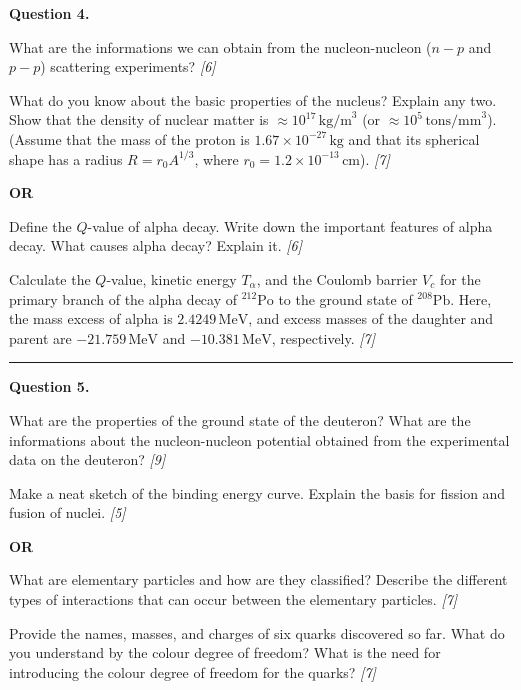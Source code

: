 \documentclass[11pt,a4paper]{article}
\newcommand{\pts}[1]{\hfill   \textit{[#1]}}
\begin{document}
\noindent   \textbf{Question 4.}

\begin{parts}
  \item What are the informations we can obtain from the nucleon-nucleon ($n-p$ and $p-p$) scattering experiments? \pts{6}
  \item What do you know about the basic properties of the nucleus? Explain any two. Show that the density of nuclear matter is $\approx 10^{17}\, \text{kg/m}^3$ (or $\approx 10^5\, \text{tons/mm}^3$). (Assume that the mass of the proton is $1.67  \times 10^{-27}\, \text{kg}$ and that its spherical shape has a radius $R = r_0 A^{1/3}$, where $r_0 = 1.2  \times 10^{-13}\, \text{cm}$). \pts{7}
\end{parts}
\hfill   \textbf{OR}

\begin{parts}
  \item Define the $Q$-value of alpha decay. Write down the important features of alpha decay. What causes alpha decay? Explain it. \pts{6}
  \item Calculate the $Q$-value, kinetic energy $T_\alpha$, and the Coulomb barrier $V_c$ for the primary branch of the alpha decay of $^{212} \text{Po}$ to the ground state of $^{208} \text{Pb}$. Here, the mass excess of alpha is $2.4249\, \text{MeV}$, and excess masses of the daughter and parent are $-21.759\, \text{MeV}$ and $-10.381\, \text{MeV}$, respectively. \pts{7}
\end{parts}

\medskip\rule{\linewidth}{0.2pt}




\noindent   \textbf{Question 5.}

\begin{parts}
  \item What are the properties of the ground state of the deuteron? What are the informations about the nucleon-nucleon potential obtained from the experimental data on the deuteron? \pts{9}
  \item Make a neat sketch of the binding energy curve. Explain the basis for fission and fusion of nuclei. \pts{5}
\end{parts}
\hfill   \textbf{OR}

\begin{parts}
  \item What are elementary particles and how are they classified? Describe the different types of interactions that can occur between the elementary particles. \pts{7}
  \item Provide the names, masses, and charges of six quarks discovered so far. What do you understand by the colour degree of freedom? What is the need for introducing the colour degree of freedom for the quarks? \pts{7}
\end{parts}
\end{document}
